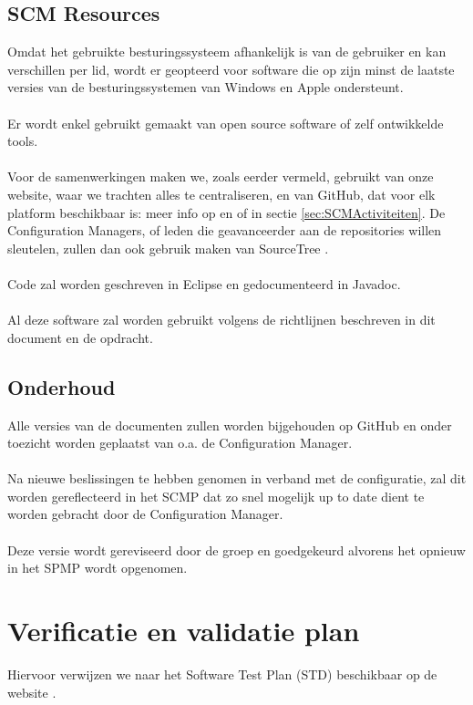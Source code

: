 \subsection{SCM Resources}
Omdat het gebruikte besturingssysteem afhankelijk is van de gebruiker en kan verschillen per lid, wordt er geopteerd voor software die op zijn minst de laatste versies van de besturingssystemen van Windows en Apple ondersteunt.
\\
\\
Er wordt enkel gebruikt gemaakt van open source software of zelf ontwikkelde tools.
\\
\\
Voor de samenwerkingen maken we, zoals eerder vermeld, gebruikt van onze website, waar we trachten alles te centraliseren, en van GitHub, dat voor elk platform beschikbaar is: meer info op \cite{GitHubWindows} en \cite{GitHubMac} of in sectie \ref{sec:SCMActiviteiten}. De Configuration Managers, of leden die geavanceerder aan de repositories willen sleutelen, zullen dan ook gebruik maken van SourceTree \cite{SourceTree}.
\\
\\
Code zal worden geschreven in Eclipse\cite{Eclipse} en gedocumenteerd in Javadoc\cite{Javadoc}.
\\
\\
Al deze software zal worden gebruikt volgens de richtlijnen beschreven in dit document en de opdracht.

\subsection{Onderhoud}
Alle versies van de documenten zullen worden bijgehouden op GitHub en onder toezicht worden geplaatst van o.a. de Configuration Manager.
\\
\\
Na nieuwe beslissingen te hebben genomen in verband met de configuratie, zal dit worden gereflecteerd in het SCMP dat zo snel mogelijk up to date dient te worden gebracht door de Configuration Manager.
\\
\\
Deze versie wordt gereviseerd door de groep en goedgekeurd alvorens het opnieuw in het SPMP wordt opgenomen.

\section{Verificatie en validatie plan}
Hiervoor verwijzen we naar het Software Test Plan (STD) beschikbaar op de website \cite{portalWebsite}.

